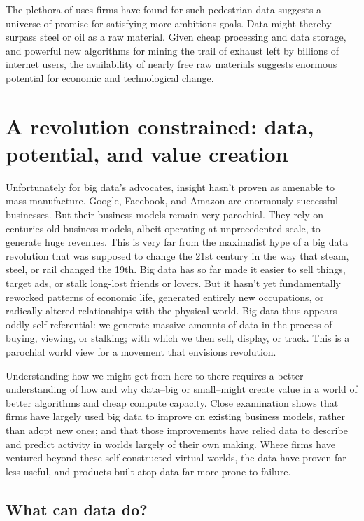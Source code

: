 \documentclass[12pt]{article}
\begin{document}
The plethora of uses firms have found for such pedestrian data
suggests a universe of promise for satisfying more ambitions
goals. Data might thereby surpass steel or oil as a raw
material. Given cheap processing and data storage, and powerful new
algorithms for mining the trail of exhaust left by billions of
internet users, the availability of nearly free raw materials suggests
enormous potential for economic and technological change. 


\section{A revolution constrained: data, potential, and value creation}
\label{sec:but-what-can}

Unfortunately for big data's advocates, insight hasn't proven as
amenable to mass-manufacture. Google, Facebook, and Amazon are
enormously successful businesses. But their business models remain
very parochial. They rely on centuries-old business models, albeit
operating at unprecedented scale, to generate huge revenues. This is
very far from the maximalist hype of a big data revolution that was
supposed to change the 21st century in the way that steam, steel, or
rail changed the 19th. Big data has so far made it easier to sell
things, target ads, or stalk long-lost friends or lovers. But it
hasn't yet fundamentally reworked patterns of economic life, generated
entirely new occupations, or radically altered relationships with the
physical world. Big data thus appears oddly self-referential: we
generate massive amounts of data in the process of buying, viewing, or
stalking; with which we then sell, display, or track. This is a
parochial world view for a movement that envisions revolution.

Understanding how we might get from here to there requires a better
understanding of how and why data--big or small--might create value in
a world of better algorithms and cheap compute capacity. Close
examination shows that firms have largely used big data to improve on
existing business models, rather than adopt new ones; and that those
improvements have relied data to describe and predict activity in
worlds largely of their own making. Where firms have ventured beyond
these self-constructed virtual worlds, the data have proven far less
useful, and products built atop data far more prone to failure. 

\subsection{What can data do?}
\label{sec:what-can-data}
\end{document}
